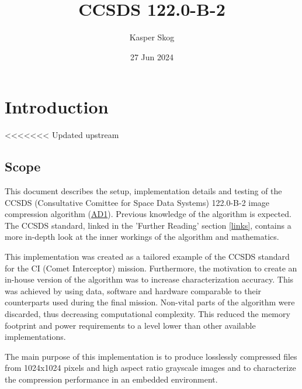 \documentclass[12pt, a4paper]{article}
\title{CCSDS 122.0-B-2}
\author{Kasper Skog}
\date{27 Jun 2024}
\begin{document}
\maketitle
\newpage
\tableofcontents

\newpage
\section{Introduction}
<<<<<<< Updated upstream

\subsection{Scope}
This document describes the setup, implementation details and testing of the 
CCSDS (Consultative Comittee for Space Data Systems) 122.0-B-2 image compression algorithm (\hyperref[lnk:1]{AD1}). 
Previous knowledge of the algorithm is expected. 
The CCSDS standard, linked in the 'Further Reading' section \ref{links}, 
contains a more in-depth look at the inner workings of the algorithm and mathematics.

\medskip
\noindent
This implementation was created as a tailored example of the CCSDS standard for the CI (Comet Interceptor) mission. 
Furthermore, the motivation to create an in-house version of the algorithm was to increase characterization accuracy. 
This was achieved by using data, software and hardware comparable to their counterparts used during the final mission. 
Non-vital parts of the algorithm were discarded, thus decreasing computational complexity. 
This reduced the memory footprint and power requirements to a level lower than other available implementations.

\medskip
\noindent
The main purpose of this implementation is to produce losslessly compressed files from 
1024x1024 pixels and high aspect ratio grayscale images and to characterize the compression performance in an embedded environment. 
\end{document}
